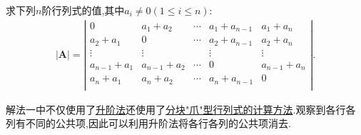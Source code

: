 \documentclass[lang=cn,newtx,10pt,scheme=chinese]{elegantbook}
\begin{document}
\begin{exercise}
求下列$n$阶行列式的值,其中$a_i\ne 0(1\le i\le n)$:
\begin{align*}
|\boldsymbol{A}|=\left| \begin{matrix}
0&		a_1+a_2&		\cdots&		a_1+a_{n-1}&		a_1+a_n\\
a_2+a_1&		0&		\cdots&		a_2+a_{n-1}&		a_2+a_n\\
\vdots&		\vdots&		&		\vdots&		\vdots\\
a_{n-1}+a_1&		a_{n-1}+a_2&		\cdots&		0&		a_{n-1}+a_n\\
a_n+a_1&		a_n+a_2&		\cdots&		a_n+a_{n-1}&		0\\
\end{matrix} \right|.
\end{align*}
\end{exercise}
\begin{note}
{\color{blue}解法一}中不仅使用了\hyperlink{行列式计算:升阶法}{升阶法}还使用了\hyperref[proposition:分块"爪"型行列式]{分块"爪"型行列式的计算方法}.观察到各行各列有不同的公共项,因此可以利用升阶法将各行各列的公共项消去.
\end{note}
\end{document}
